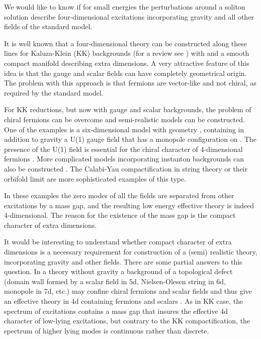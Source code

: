 \documentclass[a4paper,12pt]{article}
\begin{document}
We would like to know if for small energies the perturbations around
a soliton solution describe four-dimensional excitations
incorporating gravity and all other fields of the standard model.

It is well known that a four-dimensional theory can be constructed
along these lines for Kaluza-Klein (KK) backgrounds (for a review see
\cite{kk}) with \coordHE{} and a
smooth compact manifold describing extra dimensions. A very
attractive feature of this idea is that the gauge and scalar fields
can have completely geometrical origin.  The problem with this
approach is that fermions are vector-like \cite{Witten:1983ux} and
not chiral, as required by the standard model.

For KK reductions, but now with gauge and scalar backgrounds, the
problem of chiral fermions can be overcome and semi-realistic models
can be constructed. One of the examples is a six-dimensional model
with geometry \coordHE{}, containing in addition to gravity a
U(1) gauge field that has a monopole configuration on \coordHE{}. The
presence of the U(1) field is essential for the chiral character of
4-dimensional fermions
\cite{Randjbar-Daemi:1982hi,Randjbar-Daemi:1983bw}. More complicated
models incorporating instanton backgrounds can also be constructed
\cite{Randjbar-Daemi:1983qa,Randjbar-Daemi:1983qb}. The Calabi-Yau
compactification in string theory or their orbifold limit
\cite{GSW:1987} are more sophisticated examples of this type.

In these examples the zero modes of all the fields are separated
from other excitations by a mass gap, and the resulting low energy
effective theory is indeed 4-dimensional.  The reason for the
existence of the mass gap is the compact character of extra
dimensions.

It would be interesting to understand whether compact character of
extra dimensions is a necessary requirement for construction of a
(semi) realistic theory, incorporating gravity and other fields.
There are some partial answers to this question. In a theory without
gravity a background of a topological defect (domain wall formed by a
scalar field in 5d, Nielsen-Olesen string in 6d, monopole in 7d,
etc.) may confine chiral fermions and scalar fields and thus give an
effective theory in 4d containing fermions and scalars
\cite{Rubakov:bb,Akama:jy}. As in KK case, the spectrum of
excitations contains a mass gap that insures the effective 4d
character of low-lying excitations, but  contrary to the KK
compactification, the spectrum of higher lying modes is continuous
rather than discrete.
\end{document}
